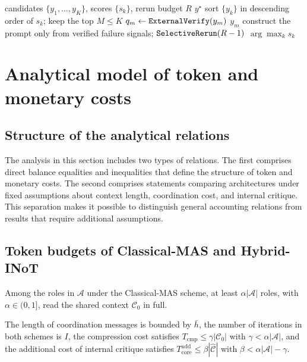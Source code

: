 \begin{algorithm}[htbp]
\caption{Selective rerun based on verified signals}\label{alg:rerun}
\begin{algorithmic}[1]
\Require candidates $\{y_1,\dots,y_K\}$, scores $\{s_k\}$, rerun budget $R$
\Ensure $y^\star$
\State sort $\{y_k\}$ in descending order of $s_k$; keep the top $M\le K$
  \State $q_m\gets\textnormal{\texttt{ExternalVerify}}(y_m)$
   \Return $y_m$ \EndIf
\EndFor
{} construct the prompt only from verified failure signals; \Return $\textnormal{\texttt{SelectiveRerun}}(R-1)$ \EndIf
\State \Return $\arg\max_k s_k$
\end{algorithmic}
\end{algorithm}

\section{Analytical model of token and monetary costs}\label{sec:analysis}

\subsection{Structure of the analytical relations}

The analysis in this section includes two types of relations. The first comprises direct balance equalities and inequalities that define the structure of token and monetary costs. The second comprises statements comparing architectures under fixed assumptions about context length, coordination cost, and internal critique. This separation makes it possible to distinguish general accounting relations from results that require additional assumptions.

\subsection{Token budgets of \textrm{Classical-MAS} and \textrm{Hybrid-INoT}}

\begin{assumption}\label{as:ctx}
Among the roles in $\mathcal{A}$ under the \textrm{Classical-MAS} scheme, at least $\alpha|\mathcal{A}|$ roles, with $\alpha\in(0,1]$, read the shared context $\mathcal{C}_0$ in full.
\end{assumption}

\begin{assumption}\label{as:bounded}
The length of coordination messages is bounded by $\bar{h}$, the number of iterations in both schemes is $I$, the compression cost satisfies $T_{\text{cmp}}\le\gamma|\mathcal{C}_0|$ with $\gamma<\alpha|\mathcal{A}|$, and the additional cost of internal critique satisfies $T_{\text{core}}^{\text{add}}\le\beta|\hat{\mathcal{C}}|$ with $\beta<\alpha|\mathcal{A}|-\gamma$.
\end{assumption}

